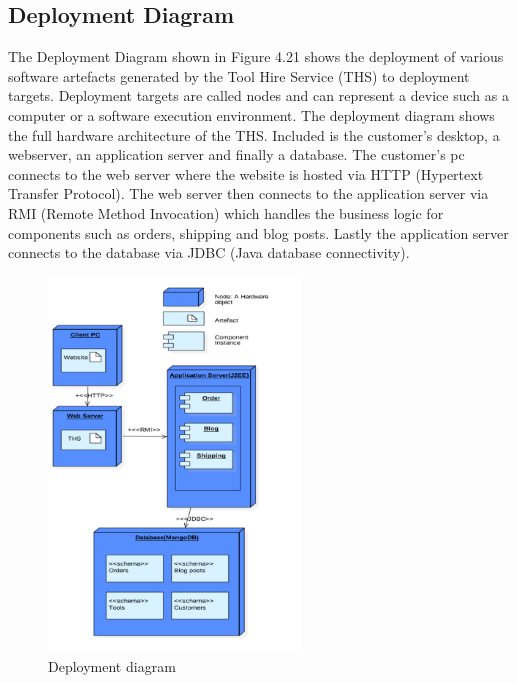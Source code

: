 \documentclass[fontsize=11pt]{extarticle}
\numberwithin{figure}{section} %
\numberwithin{table}{section}%
\begin{document}
\hypertarget{deployment-diagram}{%
\subsection{Deployment Diagram}\label{deployment-diagram}}

The Deployment Diagram shown in Figure 4.21 shows the deployment of
various software artefacts generated by the Tool Hire Service (THS) to
deployment targets. Deployment targets are called nodes and can
represent a device such as a computer or a software execution
environment. The deployment diagram shows the full hardware architecture
of the THS. Included is the customer's desktop, a webserver, an
application server and finally a database. The customer's pc connects to
the web server where the website is hosted via HTTP (Hypertext Transfer
Protocol). The web server then connects to the application server via
RMI (Remote Method Invocation) which handles the business logic for
components such as orders, shipping and blog posts. Lastly the
application server connects to the database via JDBC (Java database
connectivity).

\begin{figure}[H]
      \centering
      \includegraphics[trim = 0 0 0 0, clip, width=0.6\textwidth]{TempImg/depD.png}
      \caption{Deployment diagram}
\end{figure}



\newpage
\end{document}
